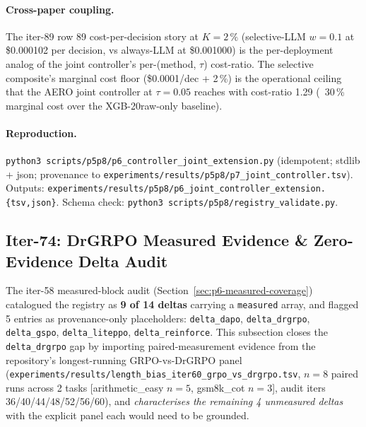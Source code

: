 \documentclass{article}
\providecommand{\secref}[1]{Section~\ref{#1}}
\begin{document}
\paragraph{Cross-paper coupling.} The iter-89 row 89 cost-per-decision
story at $K{=}2\,\%$ (selective-LLM $w{=}0.1$ at \$0.000102 per
decision, vs always-LLM at \$0.001000) is the per-deployment analog
of the joint controller's per-(method, $\tau$) cost-ratio. The selective
composite's marginal cost floor (\$0.0001/dec + 2\,\%) is the
operational ceiling that the AERO joint controller at
$\tau{=}0.05$ reaches with cost-ratio 1.29 (~30\,\% marginal cost
over the XGB-20raw-only baseline).

\paragraph{Reproduction.}
\texttt{python3 scripts/p5p8/p6\_controller\_joint\_extension.py}
(idempotent; stdlib + json; provenance to
\texttt{experiments/results/p5p8/p7\_joint\_controller.tsv}).
Outputs: \texttt{experiments/results/p5p8/p6\_joint\_controller\_extension.\{tsv,json\}}.
Schema check: \texttt{python3 scripts/p5p8/registry\_validate.py}.
 \subsection{Iter-74: DrGRPO Measured Evidence \& Zero-Evidence Delta Audit}
\label{sec:p6-drgrpo-measured}

The iter-58 measured-block audit (\secref{sec:p6-measured-coverage})
catalogued the registry as \textbf{9 of 14 deltas} carrying a
\texttt{measured} array, and flagged 5 entries as provenance-only
placeholders: \texttt{delta\_dapo}, \texttt{delta\_drgrpo},
\texttt{delta\_gspo}, \texttt{delta\_liteppo},
\texttt{delta\_reinforce}. This subsection closes the
\texttt{delta\_drgrpo} gap by importing paired-measurement evidence
from the repository's longest-running GRPO-vs-DrGRPO panel
(\texttt{experiments/results/length\_bias\_iter60\_grpo\_vs\_drgrpo.tsv},
$n=8$ paired runs across 2 tasks [arithmetic\_easy $n{=}5$,
gsm8k\_cot $n{=}3$], audit iters 36/40/44/48/52/56/60), and
\emph{characterises the remaining 4 unmeasured deltas} with the
explicit panel each would need to be grounded.
\end{document}
